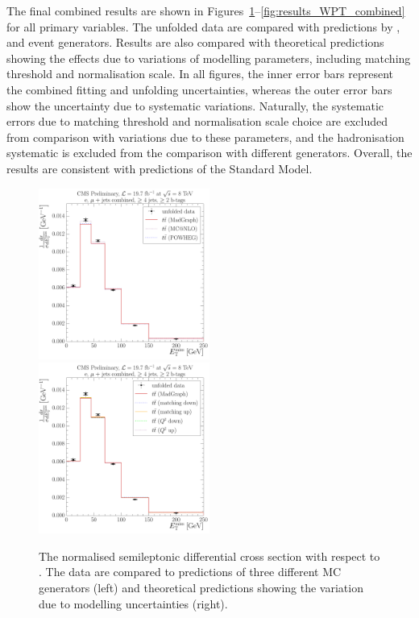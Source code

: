 The final combined results are shown in Figures~\ref{fig:results_MET_combined}--\ref{fig:results_WPT_combined} for all
primary variables. The unfolded data are compared with predictions by \MADGRAPH, \POWHEG and \MCATNLO event generators.
Results are also compared with theoretical predictions showing the effects due to variations of modelling parameters,
including matching threshold and normalisation scale. In all figures, the inner error bars represent the combined
fitting and unfolding uncertainties, whereas the outer error bars show the uncertainty due to systematic variations.
Naturally, the systematic errors due to matching threshold and normalisation scale choice are excluded from comparison
with variations due to these parameters, and the hadronisation systematic is excluded from the comparison with different
generators. Overall, the results are consistent with predictions of the Standard Model.


\begin{figure}[!htbp]
	\centering
  	{\includegraphics[width=0.5\textwidth]{measurement/MET/central/normalised_xsection_combined_different_generators}}\hfill
  	{\includegraphics[width=0.5\textwidth]{measurement/MET/central/normalised_xsection_combined_systematics_shifts}}
    \caption[The normalised semileptonic \ttbar differential cross section with respect to \MET.]{The normalised
      semileptonic \ttbar differential cross section with respect to \MET. The data are compared to predictions of three
      different MC generators (left) and theoretical predictions showing the variation due to modelling uncertainties
      (right).}
    \label{fig:results_MET_combined}
\end{figure}

